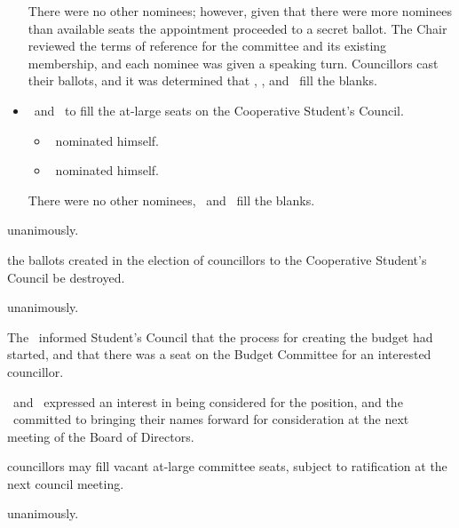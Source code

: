 \documentclass[12pt, letterpaper]{article}
\begin{document}
\begin{motion}
\begin{itemize}
            There were no other nominees; however, given that there were more
            nominees than available seats the appointment proceeded to a
            secret ballot. The Chair reviewed the terms of reference for the 
            committee and its existing membership, and each nominee was
            given a speaking turn. Councillors cast their ballots, and it was
            determined that \rebecca, \seneca, and \elizabeth\ fill the blanks. 

        \item \blank\ and \blank\ to fill the at-large seats on the 
            Cooperative Student's Council.
            \begin{itemize}
                \item \william\ nominated himself.
                \item \jason\ nominated himself.
            \end{itemize}

            There were no other nominees, \william\ and \jason\ fill the 
            blanks. 
    \end{itemize}


    \carries unanimously.
\end{motion}

\begin{motion}
    \birt the ballots created in the election of councillors to the 
    Cooperative Student's Council be destroyed. 
    \movers{\brian}{\jill}

    \carries unanimously. 
\end{motion}

\begin{information}

    The \vpof\ informed Student's Council that the process for creating the 
    budget had started, and that there was a seat on the Budget Committee
    for an interested councillor. 

    \seneca\ and \wenyu\ expressed an interest in being considered for the 
    position, and the \vpof\ committed to bringing their names forward
    for consideration at the next meeting of the Board of Directors. 

\end{information}

\begin{motion}
    \birt councillors may fill vacant at-large committee seats, subject to 
    ratification at the next council meeting. 
    \movers{\jason}{\ben}

    \carries unanimously.
\end{motion}
\end{document}
